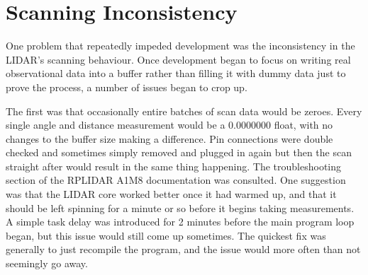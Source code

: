 	\section{Scanning Inconsistency}
	One problem that repeatedly impeded development was the inconsistency in the LIDAR's scanning behaviour. Once development began to focus on writing real observational data into a buffer rather than filling it with dummy data just to prove the process, a number of issues began to crop up.
	
	The first was that occasionally entire batches of scan data would be zeroes. Every single angle and distance measurement would be a 0.0000000 float, with no changes to the buffer size making a difference. Pin connections were double checked and sometimes simply removed and plugged in again but then the scan straight after would result in the same thing happening. The troubleshooting section of the RPLIDAR A1M8 documentation was consulted. One suggestion was that the LIDAR core worked better once it had warmed up, and that it should be left spinning for a minute or so before it begins taking measurements. A simple task delay was introduced for 2 minutes before the main program loop began, but this issue would still come up sometimes. The quickest fix was generally to just recompile the program, and the issue would more often than not seemingly go away.